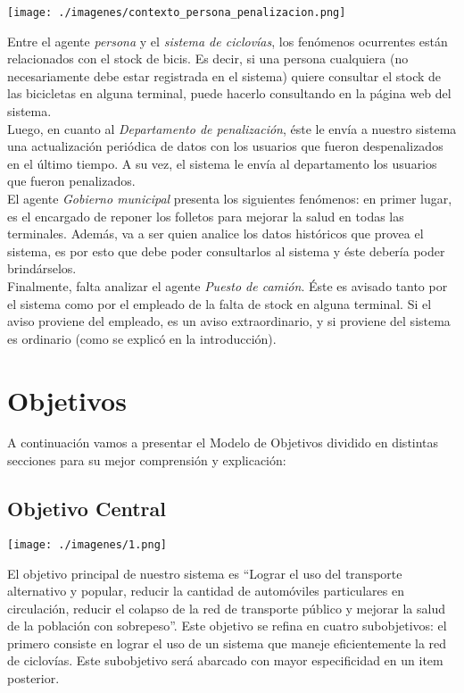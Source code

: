 \documentclass[a4paper, 11pt, spanish]{article}
\begin{document}
\centerline{\texttt{[image: ./imagenes/contexto\_persona\_penalizacion.png]}}

Entre el agente \textit{persona} y el \textit{sistema de ciclovías}, los fenómenos ocurrentes están relacionados con el stock de bicis. Es decir, si una persona cualquiera (no necesariamente debe estar registrada en el sistema) quiere consultar el stock de las bicicletas en alguna terminal, puede hacerlo consultando en la página web del sistema.\\

Luego, en cuanto al \textit{Departamento de penalización}, éste le envía a nuestro sistema una actualización periódica de datos con los usuarios que fueron despenalizados en el último tiempo. A su vez, el sistema le envía al departamento los usuarios que fueron penalizados.\\

El agente \textit{Gobierno municipal} presenta los siguientes fenómenos: en primer lugar, es el encargado de reponer los folletos para mejorar la salud en todas las terminales. Además, va a ser quien analice los datos históricos que provea el sistema, es por esto que debe poder consultarlos al sistema y éste debería poder brindárselos.\\

Finalmente, falta analizar el agente \textit{Puesto de camión}. Éste es avisado tanto por el sistema como por el empleado de la falta de stock en alguna terminal. Si el aviso proviene del empleado, es un aviso extraordinario, y si proviene del sistema es ordinario (como se explicó en la introducción).\\

 \newpage
\section{Objetivos}
A continuación vamos a presentar el Modelo de Objetivos dividido en distintas secciones para su mejor comprensión y explicación:

\subsection{Objetivo Central}

\centerline{\texttt{[image: ./imagenes/1.png]}}

\vspace*{0.7cm}

El objetivo principal de nuestro sistema es “Lograr el uso del transporte alternativo y popular, reducir la cantidad de automóviles particulares en circulación, reducir el colapso de la red de transporte público y mejorar la salud de la población con sobrepeso”. Este objetivo se refina en cuatro subobjetivos: el primero consiste en lograr el uso de un sistema que maneje eficientemente la red de ciclovías. Este subobjetivo será abarcado con mayor especificidad en un item posterior. \\
\end{document}
